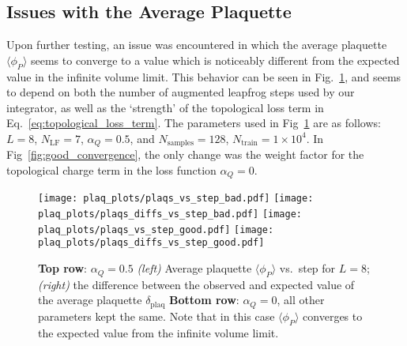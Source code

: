 \documentclass[../main.tex]{subfiles}
\begin{document}
\subsection*{Issues with the Average Plaquette}
%
Upon further testing, an issue was encountered in which the average plaquette $\langle \phi_{P}\rangle$ seems to
converge to a value which is noticeably different from the expected value in the infinite volume limit.
%
This behavior can be seen in Fig.~\ref{fig:bad_convergence}, and seems to depend on both the number of augmented
leapfrog steps used by our integrator, as well as the `strength' of the topological loss term in
Eq.~\ref{eq:topological_loss_term}.
%
The parameters used in Fig~\ref{fig:bad_convergence} are as follows: $L = 8$, $N_{\mathrm{LF}} = 7$, $\alpha_{Q} =
0.5$, and $N_{\mathrm{samples}} = 128$, $N_{\mathrm{train}} = 1\times10^{4}$.
%
In Fig~\ref{fig:good_convergence}, the only change was the weight factor for the topological charge term in the loss
function $\alpha_{Q} = 0$.
%
\begin{figure}[htpb]\label{fig:bad_convergence}
  \centering
  \texttt{[image: plaq\_plots/plaqs\_vs\_step\_bad.pdf]}
  \texttt{[image: plaq\_plots/plaqs\_diffs\_vs\_step\_bad.pdf]}
  \texttt{[image: plaq\_plots/plaqs\_vs\_step\_good.pdf]}
  \texttt{[image: plaq\_plots/plaqs\_diffs\_vs\_step\_good.pdf]}
  \caption{\textbf{Top row}: $\alpha_{Q} = 0.5$ \textit{(left)} Average plaquette $\langle\phi_{P}\rangle$ vs.\ step
    for $L=8$; \textit{(right)} the difference between the observed and expected value of the average plaquette
    $\delta_{\mathrm{plaq}}$ \textbf{Bottom row}: $\alpha_{Q} = 0$, all other parameters kept the same. Note that in
    this case $\langle \phi_{P}\rangle$ converges to the expected value from the infinite volume limit.} 
\end{figure}
\end{document}
